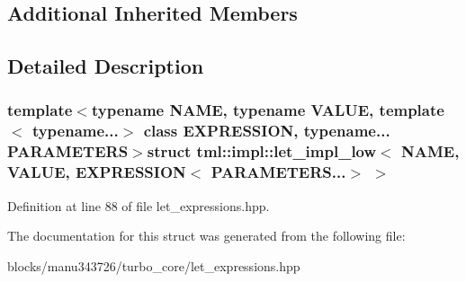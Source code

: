 \subsection*{Additional Inherited Members}


\subsection{Detailed Description}
\subsubsection*{template$<$typename N\+A\+M\+E, typename V\+A\+L\+U\+E, template$<$ typename...$>$ class E\+X\+P\+R\+E\+S\+S\+I\+O\+N, typename... P\+A\+R\+A\+M\+E\+T\+E\+R\+S$>$struct tml\+::impl\+::let\+\_\+impl\+\_\+low$<$ N\+A\+M\+E, V\+A\+L\+U\+E, E\+X\+P\+R\+E\+S\+S\+I\+O\+N$<$ P\+A\+R\+A\+M\+E\+T\+E\+R\+S...$>$ $>$}



Definition at line 88 of file let\+\_\+expressions.\+hpp.



The documentation for this struct was generated from the following file\+:\begin{DoxyCompactItemize}
\item 
blocks/manu343726/turbo\+\_\+core/let\+\_\+expressions.\+hpp\end{DoxyCompactItemize}
